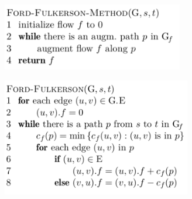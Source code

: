 \documentclass[12pt]{report}
\begin{document}
\vspace{\baselineskip}
\begin{multicols}{2}



\begin{figure}[H]
	\begin{Center}
		\includegraphics[width=3.11in,height=1.15in]{./media/image146.png}
	\end{Center}
\end{figure}



\par




\begin{figure}[H]
	\begin{Center}
		\includegraphics[width=3.25in,height=2.02in]{./media/image147.png}
	\end{Center}
\end{figure}



\par


\vspace{\baselineskip}

\end{multicols}

\vspace{\baselineskip}
\end{document}
